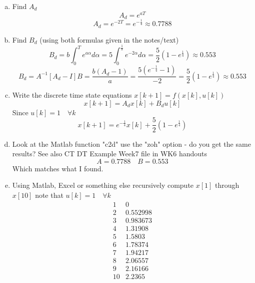\documentclass{article}
\begin{document}
\begin{enumerate}[a)]
\item Find $A_d$
\newline
\newline
$$A_d = e^{aT} $$
$$A_d = e^{-2T} = e^{-\frac{1}{4}} \approx 0.7788 $$
\item Find $B_d$ (using both formulas given in the notes/text)
\newline
\newline
$$B_d = b\int_0^Te^{a\alpha}d\alpha = 5\int_0^\frac{1}{8} e^{-2\alpha}d\alpha = \frac{5}{2}(1-e^{\frac{1}{4}}) \approx 0.553 $$
$$B_d = A^{-1}[A_d-I]B  = \frac{b(A_d-1)}{a} = \frac{5(e^{-\frac{1}{4}}-1)}{-2} = \frac{5}{2}(1-e^{\frac{1}{4}}) \approx 0.553 $$
\item Write the discrete time state equations $x[k+1] = f(x[k],u[k])$
\newline
\newline
$$x[k+1] = A_dx[k] + B_du[k]$$
Since $u[k] = 1 \quad \forall k$
$$x[k+1] = e^{-\frac{1}{4}}x[k] + \frac{5}{2}(1-e^{\frac{1}{4}}) $$
\item Look at the Matlab function "c2d" use the "zoh" option - do you get the same results?
See also CT DT Example Week7 file in WK6 handouts
\newline
\newline
$$ A = 0.7788 \quad B = 0.553 $$
Which matches what I found.
\item Using Matlab, Excel or something else recursively compute $x[1]$ through $x[10]$ note that $u[k]=1\quad \forall k$
\newline
\newline
$$
\begin{matrix}
1 & 0 \\
2 & 0.552998 \\
3 & 0.983673 \\
4 & 1.31908 \\
5 & 1.5803 \\
6 & 1.78374 \\
7 & 1.94217 \\
8 & 2.06557 \\
9 & 2.16166 \\
10 & 2.2365
\end{matrix}
$$
\end{enumerate}
\end{document}
